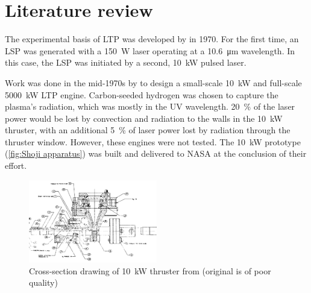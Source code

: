     \section{Literature review}


        The experimental basis of LTP was developed by \textcite{generalovContinuousOpticalDischarge1970} in 1970. For the first time, an LSP was generated with a \qty{150}{W}  laser operating at a \qty{10.6}{μm} wavelength. In this case, the LSP was initiated by a second, \qty{10}{kW} pulsed  laser.
        

        Work was done in the mid-1970s by \textcite{shojiLaserheatedRocketThruster1977,shojiPerformanceHeatTransfer1976a} to design a small-scale \qty{10}{kW} and full-scale \qty{5000}{kW} LTP engine. Carbon-seeded hydrogen was chosen to capture the plasma's radiation, which was mostly in the UV wavelength. \qty{20}{\%} of the laser power would be lost by convection and radiation to the walls in the \qty{10}{kW} thruster, with an additional \qty{5}{\%} of laser power lost by radiation through the thruster window. However, these engines were not tested. The \qty{10}{kW} prototype (\autoref{fig:Shoji apparatus}) was built and delivered to NASA at the conclusion of their effort.
        \begin{figure}[!ht]
            \centering
            \includegraphics[width=0.5\textwidth]{assets/2 background/Shoji cross-section.png}
            \caption{Cross-section drawing of \qty{10}{kW} thruster from \textcite{shojiLaserheatedRocketThruster1977} (original is of poor quality)}
            \label{fig:Shoji apparatus}
        \end{figure}

